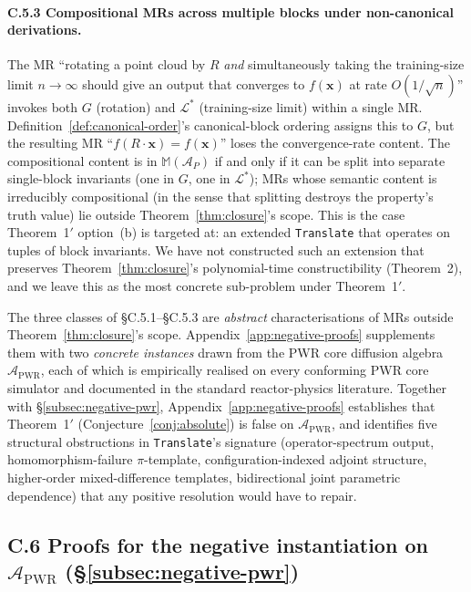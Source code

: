 \documentclass[manuscript]{acmart}
\begin{document}
\paragraph{C.5.3 Compositional MRs across multiple blocks under non-canonical derivations.}
The MR ``rotating a point cloud by $R$ \emph{and} simultaneously taking the training-size limit $n \to \infty$ should give an output that converges to $f(\mathbf{x})$ at rate $O(1/\sqrt{n})$'' invokes both $G$ (rotation) and $\mathcal{L}^*$ (training-size limit) within a single MR. Definition~\ref{def:canonical-order}'s canonical-block ordering assigns this to $G$, but the resulting MR ``$f(R\cdot\mathbf{x}) = f(\mathbf{x})$'' loses the convergence-rate content. The compositional content is in $\mathbb{M}(\mathcal{A}_P)$ if and only if it can be split into separate single-block invariants (one in $G$, one in $\mathcal{L}^*$); MRs whose semantic content is irreducibly compositional (in the sense that splitting destroys the property's truth value) lie outside Theorem~\ref{thm:closure}'s scope. This is the case Theorem~1$'$ option~(b) is targeted at: an extended \texttt{Translate} that operates on tuples of block invariants. We have not constructed such an extension that preserves Theorem~\ref{thm:closure}'s polynomial-time constructibility (Theorem~2), and we leave this as the most concrete sub-problem under Theorem~1$'$.

The three classes of \S C.5.1--\S C.5.3 are \emph{abstract} characterisations of MRs outside Theorem~\ref{thm:closure}'s scope. Appendix~\ref{app:negative-proofs} supplements them with two \emph{concrete instances} drawn from the PWR core diffusion algebra $\mathcal{A}_{\mathrm{PWR}}$, each of which is empirically realised on every conforming PWR core simulator and documented in the standard reactor-physics literature. Together with \S\ref{subsec:negative-pwr}, Appendix~\ref{app:negative-proofs} establishes that Theorem~1$'$ (Conjecture~\ref{conj:absolute}) is false on $\mathcal{A}_{\mathrm{PWR}}$, and identifies five structural obstructions in \texttt{Translate}'s signature (operator-spectrum output, homomorphism-failure $\pi$-template, configuration-indexed adjoint structure, higher-order mixed-difference templates, bidirectional joint parametric dependence) that any positive resolution would have to repair.

\subsection*{C.6 Proofs for the negative instantiation on $\mathcal{A}_{\mathrm{PWR}}$ (\S\ref{subsec:negative-pwr})}
\label{app:negative-proofs}
\end{document}
